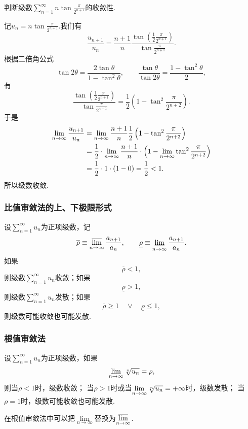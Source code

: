 \begin{example}
\def\s{\sum\limits_{n=1}^\infty }
\def\un{n \tan\frac{\pi}{2^{n+1}}}
判断级数\(\s \un\)的收敛性.
\begin{solution}
记\(u_n = \un\).我们有\[
\frac{u_{n+1}}{u_n}
= \frac{n+1}{n} \frac{\tan(\frac{1}{2}\frac{\pi}{2^{n+1}})}{\tan\frac{\pi}{2^{n+1}}}.
\]根据二倍角公式\[
\tan2\theta = \frac{2\tan\theta}{1-\tan^2\theta},
\qquad
\frac{\tan\theta}{\tan2\theta} = \frac{1-\tan^2\theta}{2},
\]有\[
\frac{\tan(\frac{1}{2}\frac{\pi}{2^{n+1}})}{\tan\frac{\pi}{2^{n+1}}}
= \frac{1}{2} \left(
	1-\tan^2\frac{\pi}{2^{n+2}}
\right).
\]于是\[
\begin{split}
\lim\limits_{n\to\infty} \frac{u_{n+1}}{u_n}
&= \lim\limits_{n\to\infty} \frac{n+1}{n} \frac{1}{2} \left(
	1-\tan^2\frac{\pi}{2^{n+2}}
\right) \\
&= \frac{1}{2} \cdot \lim\limits_{n\to\infty} \frac{n+1}{n} \cdot \left(
	1 - \lim\limits_{n\to\infty} \tan^2\frac{\pi}{2^{n+2}}
\right) \\
&= \frac{1}{2} \cdot 1 \cdot (1 - 0) = \frac{1}{2} < 1.
\end{split}
\]所以级数收敛.
\end{solution}
\end{example}

\subsubsection{比值审敛法的上、下极限形式}
\begin{corollary}\label{theorem:无穷级数.正项级数的比值审敛法的上下极限形式}
\def\orho{\overline{\rho}}
\def\urho{\underline{\rho}}
设\(\sum\limits_{n=1}^\infty u_n\)为正项级数，记\[
\orho \equiv \varlimsup\limits_{n\to\infty} \frac{a_{n+1}}{a_n},
\qquad
\urho \equiv \varliminf\limits_{n\to\infty} \frac{a_{n+1}}{a_n}.
\]如果\[
\orho < 1,
\]则级数\(\sum\limits_{n=1}^\infty u_n\)收敛；如果\[
\urho > 1,
\]则级数\(\sum\limits_{n=1}^\infty u_n\)发散；如果\[
\orho \geq 1
\quad\lor\quad
\urho \leq 1,
\]则级数可能收敛也可能发散.
\end{corollary}

\subsubsection{根值审敛法}
\begin{theorem}\label{theorem:无穷级数.正项级数的根值审敛法}
设\(\sum\limits_{n=1}^\infty u_n\)为正项级数，如果\[
\lim\limits_{n\to\infty} \sqrt[n]{u_n}=\rho,
\]则当\(\rho<1\)时，级数收敛；
当\(\rho>1\)时或当\(\lim\limits_{n\to\infty} \sqrt[n]{u_n}=+\infty\)时，级数发散；
当\(\rho=1\)时，级数可能收敛也可能发散.
\end{theorem}
在根值审敛法中可以把\(\lim\limits_{n\to\infty}\)替换为\(\varlimsup\limits_{n\to\infty}\).

